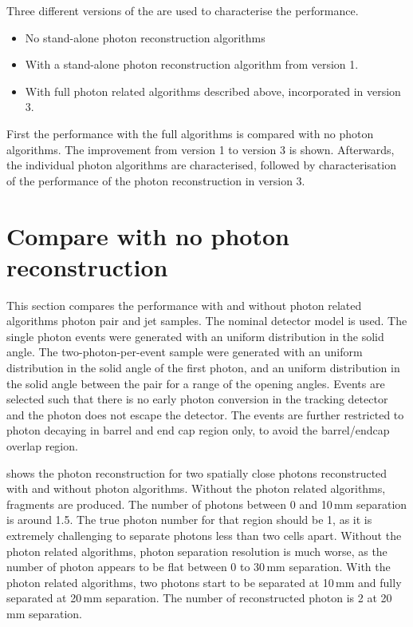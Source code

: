 Three different versions of the \pandora are used to characterise  the performance.
\begin{itemize}
  \item No stand-alone photon reconstruction algorithms
  \item With a stand-alone photon reconstruction algorithm from \pandora version 1.
  \item With full photon related algorithms described above, incorporated in \pandora version 3.
\end{itemize}

First the performance with the full algorithms is compared with no photon algorithms. The improvement from  \pandora version 1 to version 3 is shown. Afterwards, the individual photon algorithms are  characterised, followed by characterisation of the performance of the photon reconstruction in \pandora version 3.

\section{Compare with no photon reconstruction}

This section compares the performance with and without photon related algorithms photon pair and jet samples. The nominal \ILD detector model is used. The single photon events were generated with an uniform distribution in the solid angle. The two-photon-per-event sample were generated with an uniform distribution in the solid angle of the first photon, and an uniform distribution in the solid angle    between the pair for a range of the opening angles. Events are selected such that there is no early photon conversion in the tracking detector and the photon does not escape the detector. The events are further restricted to photon decaying in barrel and end cap region only, to avoid the barrel/endcap overlap region.


 shows the photon reconstruction for two spatially close photons  reconstructed with and without photon algorithms. Without the photon related algorithms, fragments are produced.  The number of photons between 0 and 10\,mm separation is around 1.5. The true photon number for that region should be 1, as it is extremely challenging to separate photons less than two cells apart.  Without the photon related algorithms, photon separation resolution is much worse, as the number of photon appears to be flat between 0 to 30\,mm separation. With the photon related algorithms, two photons start to be separated at 10\,mm and fully separated at 20\,mm separation.  The number of reconstructed photon is 2 at 20\,mm separation.



